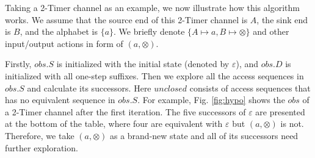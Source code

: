 \documentclass[conference, a4paper]{IEEEtran}
\newcommand{\rblock}[0]{\circleddash}
\newcommand{\rread}[0]{\rhd}
\newcommand{\rnoread}[0]{\otimes}
\newcommand{\rempty}[0]{\varnothing}
\begin{document}
Taking a 2-Timer channel as an example, we now illustrate how this algorithm works. 
We assume that the source end of this 2-Timer channel is $A$, the sink end is $B$, and the alphabet
is $\{a\}$. We briefly denote $\{A\mapsto a,B\mapsto \rnoread\}$ and other input/output actions in form of
$(a,\rnoread)$.

Firstly, $obs.S$ is initialized with the initial state (denoted by $\varepsilon$), and $obs.D$ is
initialized with all one-step suffixes.
Then we explore all the access sequences in $obs.S$ and calculate its successors. Here
$unclosed$ consists of access sequences that has no equivalent sequence in $obs.S$. 
For example, Fig. \ref{fig:hypo} shows the $obs$ of a 2-Timer channel after the first
iteration. The five successors of $\varepsilon$ are presented at the bottom of the table, where
four are equivalent with $\varepsilon$ but $(a,\rnoread)$ is not. Therefore, we take $(a,\rnoread)$ as a
brand-new state and all of its successors need further exploration. 

\end{document}
